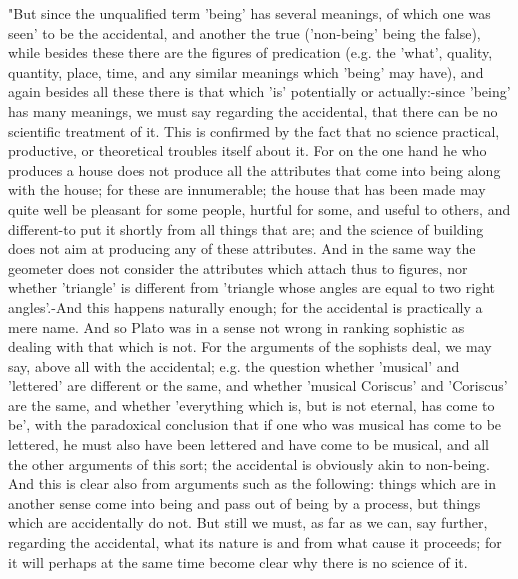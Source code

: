 "But since the unqualified term 'being' has several meanings, of which
one was seen' to be the accidental, and another the true ('non-being'
being the false), while besides these there are the figures of predication
(e.g. the 'what', quality, quantity, place, time, and any similar
meanings which 'being' may have), and again besides all these there
is that which 'is' potentially or actually:-since 'being' has many
meanings, we must say regarding the accidental, that there can be
no scientific treatment of it. This is confirmed by the fact that
no science practical, productive, or theoretical troubles itself about
it. For on the one hand he who produces a house does not produce all
the attributes that come into being along with the house; for these
are innumerable; the house that has been made may quite well be pleasant
for some people, hurtful for some, and useful to others, and different-to
put it shortly from all things that are; and the science of building
does not aim at producing any of these attributes. And in the same
way the geometer does not consider the attributes which attach thus
to figures, nor whether 'triangle' is different from 'triangle whose
angles are equal to two right angles'.-And this happens naturally
enough; for the accidental is practically a mere name. And so Plato
was in a sense not wrong in ranking sophistic as dealing with that
which is not. For the arguments of the sophists deal, we may say,
above all with the accidental; e.g. the question whether 'musical'
and 'lettered' are different or the same, and whether 'musical Coriscus'
and 'Coriscus' are the same, and whether 'everything which is, but
is not eternal, has come to be', with the paradoxical conclusion that
if one who was musical has come to be lettered, he must also have
been lettered and have come to be musical, and all the other arguments
of this sort; the accidental is obviously akin to non-being. And this
is clear also from arguments such as the following: things which are
in another sense come into being and pass out of being by a process,
but things which are accidentally do not. But still we must, as far
as we can, say further, regarding the accidental, what its nature
is and from what cause it proceeds; for it will perhaps at the same
time become clear why there is no science of it. 

